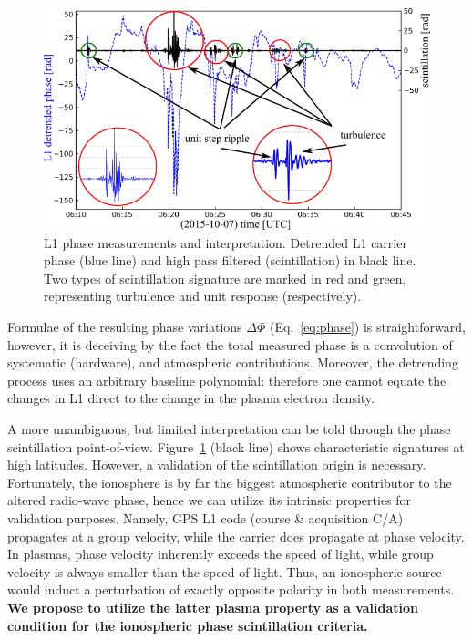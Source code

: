 \documentclass[letterpaper,12pt]{article}
\begin{document}
\vspace{-0.5em}
\begin{figure}
\vspace{-1em}
\centering
\includegraphics[width=.48\textwidth]{fig/L1-turbulence}
\caption{L1 phase measurements and interpretation. Detrended L1 carrier phase (blue line) and high pass filtered (scintillation) in black line. Two types of scintillation signature are marked in red and green, representing turbulence and unit response (respectively).}    
\label{fig:phase-signature}
\end{figure}
Formulae of the resulting phase variations $\Delta\Phi$ (Eq.~\ref{eq:phase}) is straightforward, however, it is deceiving by the fact the total measured phase is a convolution of systematic (hardware), and atmospheric contributions. Moreover, the detrending process uses an arbitrary baseline polynomial: therefore one cannot equate the changes in L1 direct to the change in the plasma electron density. %

A more unambiguous, but limited interpretation can be told through the phase scintillation point-of-view. Figure~\ref{fig:phase-signature} (black line) shows characteristic signatures at high latitudes. However, a validation of the scintillation origin is necessary. Fortunately, the ionosphere is by far the biggest atmospheric contributor to the altered radio-wave phase, hence we can utilize its intrinsic properties for validation purposes. Namely, GPS L1 code (course \& acquisition C/A) propagates at a group velocity, while the carrier does propagate at phase velocity. In plasmas, phase velocity inherently exceeds the speed of light, while group velocity is always smaller than the speed of light. Thus, an ionospheric source would induct a perturbation of exactly opposite polarity in both measurements. \textbf{We propose to utilize the latter plasma property as a validation condition for the ionospheric phase scintillation criteria.}
\end{document}

